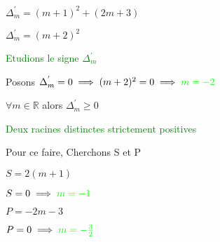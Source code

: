 \documentclass[12pt]{article}
\begin{document}
$\Delta_{m}^{'}=(m+1)^{2}+(2m +3 )$

$\Delta_{m}^{'}=(m+2)^{2}$

\textcolor{green}{Etudions le signe $\Delta_{m}^{'}$}

Posons $\Delta_{m}^{'}=0\implies (m+2)^{2}=0\implies \textcolor{green}{m=-2}$

$\forall m\in \mathbb{R} $ alors $\Delta_{m}^{'}\geq 0$

\textcolor{green}{Deux racines distinctes strictement positives}

Pour ce faire, Cherchons S et P

$S=2(m + 1)$

$S=0\implies \textcolor{green}{m=-1}$

$P=-2m-3$

$P=0\implies \textcolor{green}{m=-\frac{3}{2}}$
\end{document}

